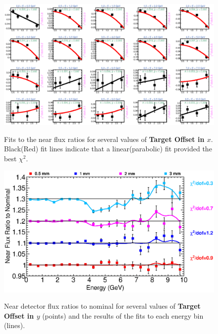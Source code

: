 {\begin{figure}[ht]
  \begin{center}
    {\includegraphics[width=5.0in]{figures/TargetXOffset_near_fits.eps}}
  \end{center}
\caption{ Fits to the near flux ratios for several values of {\bf Target Offset in $x$}. Black(Red) fit lines indicate that a linear(parabolic) fit provided the best $\chi^2$. }
\end{figure}

\begin{figure}[ht]
  \begin{center}
    {\includegraphics[width=6.0in]{figures/TargetYOffset_near_summary.eps}}
  \end{center}
\caption{ Near detector flux ratios to nominal for several values of {\bf Target Offset in $y$} (points) and the results of the fits to each energy bin (lines).}
\end{figure}

}
